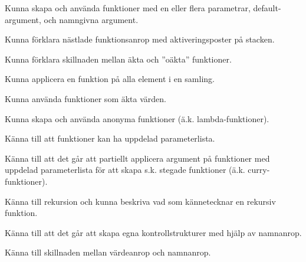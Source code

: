 
\item Kunna skapa och använda funktioner med en eller flera parametrar, default-argument, och namngivna argument.
\item Kunna förklara nästlade funktionsanrop med aktiveringsposter på stacken.
\item Kunna förklara skillnaden mellan äkta och ''oäkta'' funktioner.
\item Kunna applicera en funktion på alla element i en samling.

\item Kunna använda funktioner som äkta värden.
\item Kunna skapa och använda anonyma funktioner (ä.k. lambda-funktioner).

\item Känna till att funktioner kan ha uppdelad parameterlista.
\item Känna till att det går att partiellt applicera argument på funktioner med uppdelad parameterlista för att skapa s.k. stegade funktioner (ä.k. curry-funktioner).

\item Känna till rekursion och kunna beskriva vad som kännetecknar en rekursiv funktion.

\item Känna till att det går att skapa egna kontrollstrukturer med hjälp av namnanrop.
\item Känna till skillnaden mellan värdeanrop och namnanrop.
